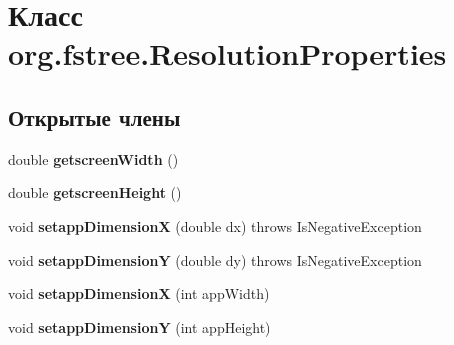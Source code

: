 \hypertarget{classorg_1_1fstree_1_1_resolution_properties}{
\section{Класс org.fstree.ResolutionProperties}
\label{classorg_1_1fstree_1_1_resolution_properties}
}
\subsection*{Открытые члены}
\begin{DoxyCompactItemize}
\item 
\hypertarget{classorg_1_1fstree_1_1_resolution_properties_a3c055e410ec998ba5d5f600afaa74988}{
double {\bfseries getscreenWidth} ()}
\label{classorg_1_1fstree_1_1_resolution_properties_a3c055e410ec998ba5d5f600afaa74988}

\item 
\hypertarget{classorg_1_1fstree_1_1_resolution_properties_a5d10b2b3b8010e7b019c98e2e36d1365}{
double {\bfseries getscreenHeight} ()}
\label{classorg_1_1fstree_1_1_resolution_properties_a5d10b2b3b8010e7b019c98e2e36d1365}

\item 
\hypertarget{classorg_1_1fstree_1_1_resolution_properties_a6839cdb8ea36e96e6925a7aec87cc73f}{
void {\bfseries setappDimensionX} (double dx)  throws IsNegativeException }
\label{classorg_1_1fstree_1_1_resolution_properties_a6839cdb8ea36e96e6925a7aec87cc73f}

\item 
\hypertarget{classorg_1_1fstree_1_1_resolution_properties_a653dfdc7c246afae7639e9fd28dd8be4}{
void {\bfseries setappDimensionY} (double dy)  throws IsNegativeException }
\label{classorg_1_1fstree_1_1_resolution_properties_a653dfdc7c246afae7639e9fd28dd8be4}

\item 
\hypertarget{classorg_1_1fstree_1_1_resolution_properties_a9e8a58b724087d2d88a565863ae8c569}{
void {\bfseries setappDimensionX} (int appWidth)}
\label{classorg_1_1fstree_1_1_resolution_properties_a9e8a58b724087d2d88a565863ae8c569}

\item 
\hypertarget{classorg_1_1fstree_1_1_resolution_properties_ac0e7161c53ffd7f4b4df31c5be90d7b3}{
void {\bfseries setappDimensionY} (int appHeight)}
\label{classorg_1_1fstree_1_1_resolution_properties_ac0e7161c53ffd7f4b4df31c5be90d7b3}


\end{DoxyCompactItemize}
